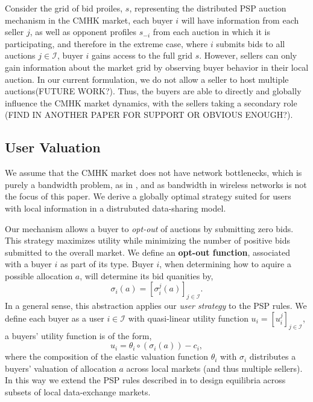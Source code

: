 \documentclass[sigconf, anonymous]{acmart}
\newcommand{\mcI}{\mathcal{I}}
\newcommand{\g}{\sigma}
\theoremstyle{definition}
\begin{document}
Consider the grid of bid proiles, $s$, representing the distributed PSP auction
mechanism in the CMHK market, each buyer $i$ will
have information from each seller $j$, as well as opponent profiles $s_{-i}$
from each auction in which it is participating, and therefore
in the extreme case, where $i$ submits bids to all auctions $j\in\mcI$, buyer
$i$ gains access to the full grid $s$. However, 
sellers can only gain information about the market grid by observing buyer
behavior in their local auction.
In our current formulation, we do not allow a seller to host multiple
auctions(FUTURE WORK?). Thus, the buyers are able to directly and globally
influence the CMHK market dynamics, with the sellers taking a secondary role
(FIND IN ANOTHER PAPER FOR SUPPORT OR OBVIOUS ENOUGH?).



\subsection{User Valuation}

We assume that the CMHK market does not have network
bottlenecks, which is purely a bandwidth problem, as in \cite{semret}, and as
bandwidth in wireless networks is not the focus of this paper. We derive a globally optimal strategy suited for
users with local information in a distrubuted data-sharing model. 

Our mechanism allows a buyer
to \emph{opt-out} of auctions by submitting zero bids. This strategy maximizes
utility while minimizing the number of positive bids submitted to the overall
market. We define an \textbf{opt-out function}, associated with a buyer $i$ as
part of its type. Buyer $i$, when determining how to aquire a possible allocation $a$,
will determine its bid quanities by,
\begin{equation}\label{opt-out}
    \g_i(a) = [\g_i^j(a)]_{j\in\mcI}.
\end{equation}
In a general sense, this abstraction applies our \emph{user strategy}
to the PSP rules.
We define each buyer as a user $i\in\mcI$ with quasi-linear utility
function $u_i = [u_i^j]_{j\in\mcI}$, a buyers' utility function is of the form,
\begin{equation}\label{buyerutility}
    u_i = \theta_i \circ (\g_i(a)) - c_i,
\end{equation}
where the composition of the elastic valuation function $\theta_i$ with $\g_i$
distributes a buyers' valuation of allocation $a$ across local markets (and thus
multiple sellers).
In this way we extend the PSP rules described
in \cite{semret} to design equilibria across subsets of local data-exchange markets.
\end{document}
